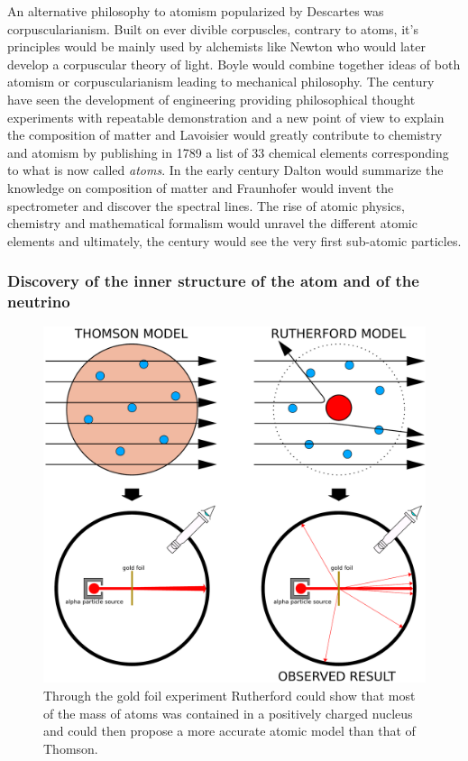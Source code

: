 	An alternative philosophy to atomism popularized by Descartes was corpuscularianism. Built on ever divible corpuscles, contrary to atoms, it's principles would be mainly used by alchemists like Newton who would later develop a corpuscular theory of light. Boyle would combine together ideas of both atomism or corpuscularianism leading to mechanical philosophy. The  century have seen the development of engineering providing philosophical thought experiments with repeatable demonstration and a new point of view to explain the composition of matter and Lavoisier would greatly contribute to chemistry and atomism by publishing in 1789 a list of 33 chemical elements corresponding to what is now called \textit{atoms}. In the early  century Dalton would summarize the knowledge on composition of matter and Fraunhofer would invent the spectrometer and discover the spectral lines. The rise of atomic physics, chemistry and mathematical formalism would unravel the different atomic elements and ultimately, the  century would see the very first sub-atomic particles.
	
	\subsubsection*{Discovery of the inner structure of the atom and of the neutrino}
	\label{chapt2:sssec:atomstructure}

	\begin{figure}[H]
		\centering
		\includegraphics[width=0.7\linewidth]{fig/chapt2/Thomson_Rutherford_atoms.pdf}
		\caption{\label{fig:Atom_models} Through the gold foil experiment Rutherford could show that most of the mass of atoms was contained in a positively charged nucleus and could then propose a more accurate atomic model than that of Thomson.}
	\end{figure}
	
